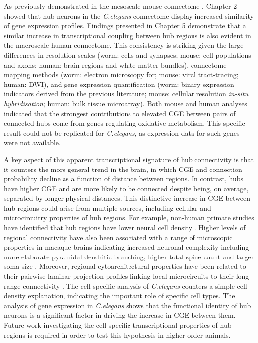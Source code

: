 As previously demonstrated in the mesoscale mouse connectome \citep{Fulcher2016}, Chapter 2 showed that hub neurons in the \textit{C.elegans} connectome display increased similarity of gene expression profiles. Findings presented in Chapter 5 demonstrate that a similar increase in transcriptional coupling between hub regions is also evident in the macroscale human connectome. This consistency is striking given the large differences in resolution scales (worm: cells and synapses; mouse: cell populations and axons; human: brain regions and white matter bundles), connectome mapping methods (worm: electron microscopy for; mouse: viral tract-tracing; human: DWI), and gene expression quantification (worm: binary expression indicators derived from the previous literature; mouse: cellular resolution \textit{in-situ hybridisation}; human: bulk tissue microarray). Both mouse and human analyses indicated that the strongest contributions to elevated CGE between pairs of connected hubs come from genes regulating oxidative metabolism. This specific result could not be replicated for \textit{C.elegans}, as expression data for such genes were not available.

A key aspect of this apparent transcriptional signature of hub connectivity is that it counters the more general trend in the brain, in which CGE and connection probability decline as a function of distance between regions. In contrast, hubs have higher CGE and are more likely to be connected despite being, on average, separated by longer physical distances. This distinctive increase in CGE between hub regions could arise from multiple sources, including cellular and microcircuitry properties of hub regions. For example, non-human primate studies have identified that hub regions have lower neural cell density \citep{Beul2017,Scholtens2014}. Higher levels of regional connectivity have also been associated with a range of microscopic properties in macaque brains indicating increased neuronal complexity including more elaborate pyramidal dendritic branching, higher total spine count and larger soma size \citep{Scholtens2014}. Moreover, regional cytoarchitectural properties have been related to their pairwise laminar-projection profiles linking local microcircuits to their long-range connectivity \citep{Barbas,Barbas2015}. The cell-specific analysis of \textit{C.elegans} counters a simple cell density explanation, indicating the important role of specific cell types. The analysis of gene expression in \textit{C.elegans} shows that the functional identity of hub neurons is a significant factor in driving the increase in CGE between them. Future work investigating the cell-specific transcriptional properties of hub regions is required in order to test this hypothesis in higher order animals.


